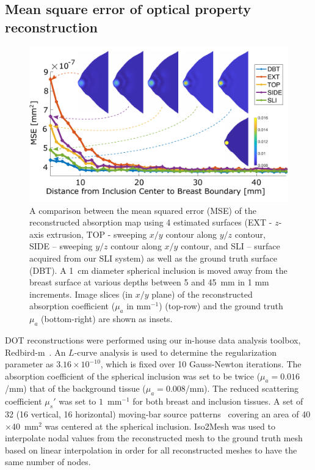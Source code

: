 \subsection{Mean square error of optical property reconstruction}
\begin{figure}
	\begin{center}
	    \includegraphics[width=.9\textwidth]{fig/omci/mse.pdf}
	\end{center}
	\caption{A comparison between the mean squared error (\ac{MSE}) of the reconstructed absorption map using 4 estimated surfaces (EXT - $z$-axis extrusion, TOP - sweeping $x/y$ contour along $y/z$ contour, SIDE -- sweeping $y/z$ contour along $x/y$ contour, and \ac{SLI} -- surface acquired from our \ac{SLI} system) as well as the ground truth surface (\ac{DBT}). A 1~cm diameter spherical inclusion is moved away from the breast surface at various depths between 5 and 45~mm in 1 mm increments. Image slices (in $x/y$ plane) of the reconstructed absorption coefficient ($\mu_a$ in mm$^{-1}$) (top-row) and the ground truth $\mu_a$ (bottom-right) are shown as insets.}
	\label{fig:mse}
\end{figure} 

\ac{DOT} reconstructions were performed using our in-house data analysis toolbox, Redbird-m~\cite{Redbird2008}. An $L$-curve analysis is used to determine the regularization parameter as $3.16\times 10^{-10}$, which is fixed over 10 Gauss-Newton iterations. The absorption coefficient of the spherical inclusion was set to be twice ($\mu_a=0.016$/mm) that of the background tissue ($\mu_a=0.008$/mm). The reduced scattering coefficient $\mu_s'$ was set to $1$~mm$^{-1}$ for both breast and inclusion tissues. A set of 32 (16 vertical, 16 horizontal) moving-bar source patterns~\cite{Yao2015} covering an area of 40$\times$40~mm$^2$ was centered at the spherical inclusion. Iso2Mesh was used to interpolate nodal values from the reconstructed mesh to the ground truth mesh based on linear interpolation in order for all reconstructed meshes to have the same number of nodes.

